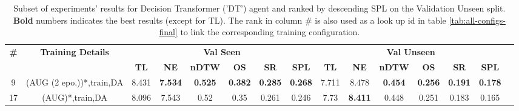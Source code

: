 \begin{table}
\centering
\caption{\label{tab:dt_dagger_envdrop}Subset of experiments' results for Decision Transformer ('DT') agent and ranked by descending SPL on the Validation Unseen split. \textbf{Bold} numbers indicates the best results (except for TL). The rank in column \# is also used as a look up id in table \ref{tab:all-configs-final} to link the corresponding training configuration.}
\begin{tabular}{@{\hskip3pt}c@{\hskip3pt}c@{\hskip3pt}c@{\hskip3pt}c@{\hskip3pt}c@{\hskip3pt}c@{\hskip3pt}c@{\hskip3pt}c@{\hskip3pt}c@{\hskip3pt}c@{\hskip3pt}c@{\hskip3pt}c@{\hskip3pt}c@{\hskip3pt}c@{\hskip3pt}c}
\toprule
                                  \textbf{\#} & \textbf{Training Details} & \multicolumn{6}{c}{\textbf{Val Seen}} & \multicolumn{6}{c}{\textbf{Val Unseen}} \\
\cmidrule(l){3-8}\cmidrule(l){9-14}\textbf{~} &                \textbf{~} &       \textbf{TL} &     \textbf{NE} &   \textbf{nDTW} &     \textbf{OS} &     \textbf{SR} &    \textbf{SPL} &         \textbf{TL} &     \textbf{NE} &   \textbf{nDTW} &     \textbf{OS} &     \textbf{SR} &    \textbf{SPL} \\
\midrule
                                            9 &  (AUG (2 epo.))*,train,DA &             8.431 &  \textbf{7.534} &  \textbf{0.525} &  \textbf{0.382} &  \textbf{0.285} &  \textbf{0.268} &               7.711 &           8.478 &  \textbf{0.454} &  \textbf{0.256} &  \textbf{0.191} &  \textbf{0.178} \\
                                           17 &           (AUG)*,train,DA &             8.096 &           7.543 &            0.52 &            0.35 &           0.261 &           0.246 &                7.73 &  \textbf{8.411} &           0.448 &           0.251 &           0.183 &           0.165 \\
\bottomrule
\end{tabular}
\end{table}
